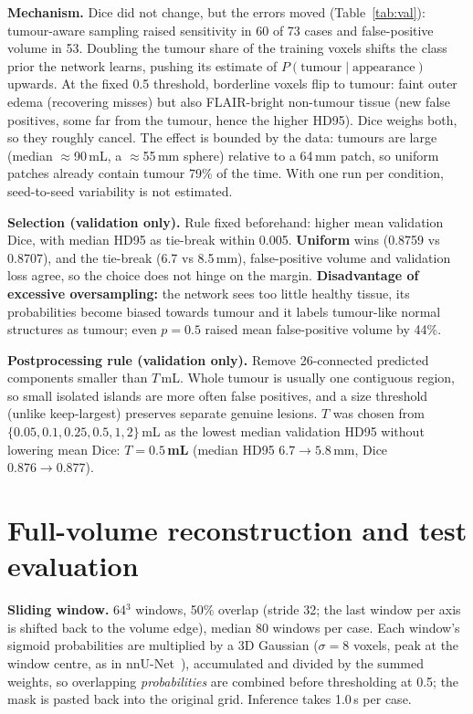 \documentclass[10pt,a4paper]{article}
\newcommand{\mL}{\,mL}
\newcommand{\mm}{\,mm}
\begin{document}
\textbf{Mechanism.} Dice did not change, but the errors moved (Table~\ref{tab:val}): tumour-aware sampling raised sensitivity in 60 of 73 cases and false-positive volume in 53. Doubling the tumour share of the training voxels shifts the class prior the network learns, pushing its estimate of $P(\text{tumour}\mid\text{appearance})$ upwards. At the fixed 0.5 threshold, borderline voxels flip to tumour: faint outer edema (recovering misses) but also FLAIR-bright non-tumour tissue (new false positives, some far from the tumour, hence the higher HD95). Dice weighs both, so they roughly cancel. The effect is bounded by the data: tumours are large (median $\approx$90\mL, a $\approx$55\mm{} sphere) relative to a 64\mm{} patch, so uniform patches already contain tumour 79\% of the time. With one run per condition, seed-to-seed variability is not estimated.

\textbf{Selection (validation only).} Rule fixed beforehand: higher mean validation Dice, with median HD95 as tie-break within 0.005. \textbf{Uniform} wins (0.8759 vs 0.8707), and the tie-break (6.7 vs 8.5\mm), false-positive volume and validation loss agree, so the choice does not hinge on the margin. \textbf{Disadvantage of excessive oversampling:} the network sees too little healthy tissue, its probabilities become biased towards tumour and it labels tumour-like normal structures as tumour; even $p=0.5$ raised mean false-positive volume by 44\%.

\textbf{Postprocessing rule (validation only).} Remove 26-connected predicted components smaller than $T$\mL. Whole tumour is usually one contiguous region, so small isolated islands are more often false positives, and a size threshold (unlike keep-largest) preserves separate genuine lesions. $T$ was chosen from $\{0.05,0.1,0.25,0.5,1,2\}$\mL{} as the lowest median validation HD95 without lowering mean Dice: \textbf{$T=0.5$\mL} (median HD95 $6.7\to5.8$\mm, Dice $0.876\to0.877$).

\section{Full-volume reconstruction and test evaluation}\label{sec:test}
\textbf{Sliding window.} 64$^3$ windows, 50\% overlap (stride 32; the last window per axis is shifted back to the volume edge), median 80 windows per case. Each window's sigmoid probabilities are multiplied by a 3D Gaussian ($\sigma=8$ voxels, peak at the window centre, as in nnU-Net~\cite{isensee2021}), accumulated and divided by the summed weights, so overlapping \emph{probabilities} are combined before thresholding at 0.5; the mask is pasted back into the original grid. Inference takes 1.0\,s per case.
\end{document}
